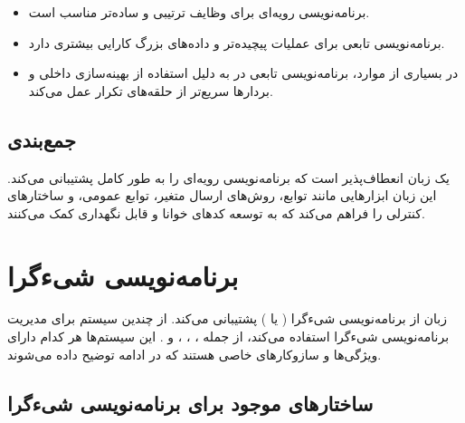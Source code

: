 \documentclass[11pt, a4paper, oneside]{book}
\begin{document}
			\begin{itemize}
				
				\item برنامه‌نویسی رویه‌ای برای وظایف ترتیبی و ساده‌تر مناسب است.
				
				\item برنامه‌نویسی تابعی برای عملیات پیچیده‌تر و داده‌های بزرگ کارایی بیشتری دارد.
				
				\item در بسیاری از موارد، برنامه‌نویسی تابعی در  به دلیل استفاده از بهینه‌سازی داخلی و بردارها سریع‌تر از حلقه‌های تکرار عمل می‌کند.
				
			\end{itemize}
		
		\section{جمع‌بندی}
		
			یک زبان انعطاف‌پذیر است که برنامه‌نویسی رویه‌ای را به طور کامل پشتیبانی می‌کند. این زبان ابزارهایی مانند توابع، روش‌های ارسال متغیر، توابع عمومی، و ساختارهای کنترلی را فراهم می‌کند که به توسعه کدهای خوانا و قابل نگهداری کمک می‌کنند.
			
	\chapter{برنامه‌نویسی شیءگرا}
	
		 زبان  از برنامه‌نویسی شیءگرا ( یا ) پشتیبانی می‌کند.  از چندین سیستم برای مدیریت برنامه‌نویسی شیءگرا استفاده می‌کند، از جمله ، ،  ، و . این سیستم‌ها هر کدام دارای ویژگی‌ها و سازوکارهای خاصی هستند که در ادامه توضیح داده می‌شوند.
		 
		 \section{ساختارهای موجود برای برنامه‌نویسی شیءگرا}
		 
\end{document}
